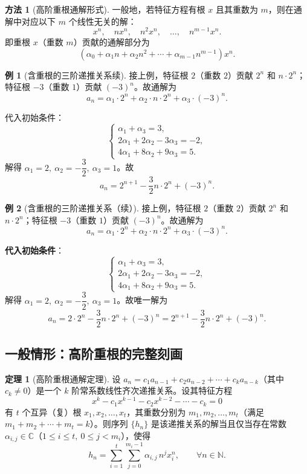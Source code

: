\documentclass[UTF8,11pt,a4paper]{ctexbook}   %
\theoremstyle{definition}
\newtheorem{theorem}{定理}[section]
\newtheorem{example}{例}[section]
\newtheorem{method}{方法}[section]
\begin{document}
\begin{method}[高阶重根通解形式]
一般地，若特征方程有根 $x$ 且其重数为 $m$，则在通解中对应以下 $m$ 个线性无关的解：
\[
x^n,\quad n x^n,\quad n^2 x^n,\quad \dots,\quad n^{m-1} x^n.
\]
即重根 $x$（重数 $m$）贡献的通解部分为
\[
(\alpha_0 + \alpha_1 n + \alpha_2 n^2 + \cdots + \alpha_{m-1} n^{m-1}) x^n.
\]
\end{method}

\begin{example}[含重根的三阶递推关系续]
接上例，特征根 $2$（重数 $2$）贡献 $2^n$ 和 $n \cdot 2^n$；特征根 $-3$（重数 $1$）贡献 $(-3)^n$。故通解为
\[
a_n = \alpha_1 \cdot 2^n + \alpha_2 \cdot n \cdot 2^n + \alpha_3 \cdot (-3)^n.
\]

代入初始条件：
\[
\begin{cases}
\alpha_1 + \alpha_3 = 3,\\[0.3em]
2\alpha_1 + 2\alpha_2 - 3\alpha_3 = -2,\\[0.3em]
4\alpha_1 + 8\alpha_2 + 9\alpha_3 = 5.
\end{cases}
\]
解得 $\alpha_1 = 2,\ \alpha_2 = -\dfrac{3}{2},\ \alpha_3 = 1$。故
\[
a_n = 2^{n+1} - \frac{3}{2}n \cdot 2^n + (-3)^n.
\]
\end{example}

\begin{example}[含重根的三阶递推关系（续）]
接上例，特征根 $2$（重数 $2$）贡献 $2^n$ 和 $n \cdot 2^n$；特征根 $-3$（重数 $1$）贡献 $(-3)^n$。故通解为
\[
a_n = \alpha_1 \cdot 2^n + \alpha_2 \cdot n \cdot 2^n + \alpha_3 \cdot (-3)^n.
\]

\textbf{代入初始条件}：
\[
\begin{cases}
\alpha_1 + \alpha_3 = 3,\\[0.3em]
2\alpha_1 + 2\alpha_2 - 3\alpha_3 = -2,\\[0.3em]
4\alpha_1 + 8\alpha_2 + 9\alpha_3 = 5.
\end{cases}
\]
解得 $\alpha_1 = 2,\ \alpha_2 = -\dfrac{3}{2},\ \alpha_3 = 1$。故唯一解为
\[
a_n = 2 \cdot 2^n - \frac{3}{2} n \cdot 2^n + (-3)^n = 2^{n+1} - \frac{3}{2}n \cdot 2^n + (-3)^n.
\]
\end{example}

\subsection{一般情形：高阶重根的完整刻画}

\begin{theorem}[高阶重根通解定理]
设 $a_n = c_1 a_{n-1} + c_2 a_{n-2} + \cdots + c_k a_{n-k}$（其中 $c_k \neq 0$）是一个 $k$ 阶常系数线性齐次递推关系。设其特征方程
\[
x^k - c_1 x^{k-1} - c_2 x^{k-2} - \cdots - c_k = 0
\]
有 $t$ 个互异（复）根 $x_1, x_2, \dots, x_t$，其重数分别为 $m_1, m_2, \dots, m_t$（满足 $m_1 + m_2 + \cdots + m_t = k$）。则序列 $\{h_n\}$ 是该递推关系的解当且仅当存在常数 $\alpha_{i,j} \in \mathbb{C}$（$1 \le i \le t,\ 0 \le j < m_i$），使得
\[
\boxed{h_n = \sum_{i=1}^{t}\sum_{j=0}^{m_i-1} \alpha_{i,j}\, n^j x_i^n,\qquad \forall n \in \mathbb{N}.}
\]
\end{theorem}
\end{document}
